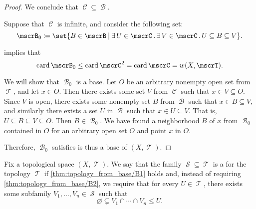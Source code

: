 \begin{proof}
  We conclude that \( \mscrC \subseteq \mscrB \).

   Suppose that \( \mscrC \) is infinite, and consider the following set:
  \begin{equation*}
    \mscrB_0 \coloneqq \set{ B \in \mscrB \given \qexists {U \in \mscrC} \qexists {V \in \mscrC} U \subseteq B \subseteq V }.
  \end{equation*}

   implies that
  \begin{equation*}
    \card\mscrB_0 \leq \card \mscrC^2 = \card \mscrC = w(X, \mscrT).
  \end{equation*}

  We will show that \( \mscrB_0 \) is a base. Let \( O \) be an arbitrary nonempty open set from \( \mscrT \), and let \( x \in O \). Then there exists some set \( V \) from \( \mscrC \) such that \( x \in V \subseteq O \). Since \( V \) is open, there exists some nonempty set \( B \) from \( \mscrB \) such that \( x \in B \subseteq V \), and similarly there exists a set \( U \) in \( \mscrB \) such that \( x \in U \subseteq V \). That is, \( U \subseteq B \subseteq V \subseteq O \). Then \( B \in \mscrB_0 \). We have found a neighborhood \( B \) of \( x \) from \( \mscrB_0 \) contained in \( O \) for an arbitrary open set \( O \) and point \( x \) in \( O \).

  Therefore, \( \mscrB_0 \) satisfies  is thus a base of \( (X, \mscrT) \).
\end{proof}

\begin{definition}\label{def:topological_subbase}
  Fix a topological space \( (X, \mscrT) \). We say that the family \( \mscrS \subseteq \mscrT \) is a  for the topology \( \mscrT \) if \ref{thm:topology_from_base/B1} holds and, instead of requiring \ref{thm:topology_from_base/B2}, we require that for every \( U \in \mscrT \), there exists some subfamily \( V_1, \ldots, V_n \in \mscrS \) such that
  \begin{equation}\label{eq:def:topological_subbase}
    \varnothing \subsetneq V_1 \cap \cdots \cap V_n \leq U.
  \end{equation}
\end{definition}

